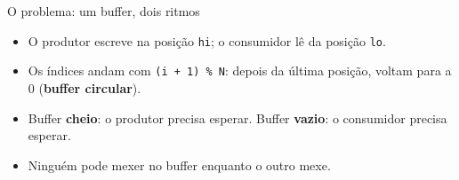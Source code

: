 \documentclass[aspectratio=169]{beamer}
\begin{document}
\begin{frame}{O problema: um buffer, dois ritmos}
\begin{center}
\end{center}

\begin{itemize}
    \item O produtor escreve na posição \texttt{hi}; o consumidor lê da posição \texttt{lo}.
    \item Os índices andam com \texttt{(i + 1) \% N}: depois da última posição, voltam para a 0 (\textbf{buffer circular}).
    \item Buffer \textbf{cheio}: o produtor precisa esperar. Buffer \textbf{vazio}: o consumidor precisa esperar.
    \item Ninguém pode mexer no buffer enquanto o outro mexe.
\end{itemize}
\end{frame}
\end{document}
